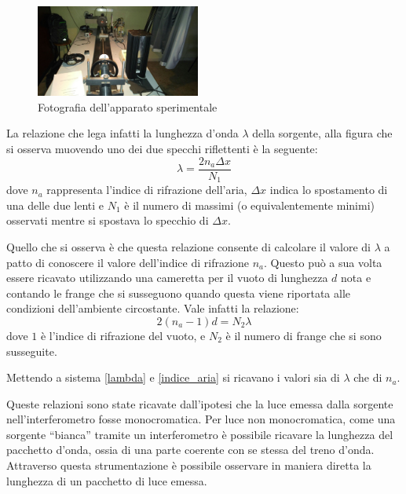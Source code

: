 \documentclass[a4paper,11pt]{article}
\newcommand{\virgolette}[1]{``#1''}
\begin{document}
	\begin{figure}
		\vspace{-1cm}
		\caption{Fotografia dell'apparato sperimentale}
		\vspace{0.2cm}
		\centering
		\label{apparato}
		\includegraphics[width=0.48\textwidth]{apparato}
		\vspace{-0.5cm}
	\end{figure}
	
	La relazione che lega infatti la lunghezza d'onda $\lambda$ della sorgente, alla figura che si osserva muovendo uno dei due specchi riflettenti è la seguente:
	\begin{equation}\label{lambdana1}
		\lambda=\dfrac{2n_a\Delta x}{N_1}
	\end{equation}
	dove $n_a$ rappresenta l'indice di rifrazione dell'aria, $\Delta x$ indica lo spostamento di una delle due lenti e $N_1$ è il numero di massimi (o equivalentemente minimi) osservati mentre si spostava lo specchio di $\Delta x$.
	
	Quello che si osserva è che questa relazione consente di calcolare il valore di $\lambda$ a patto di conoscere il valore dell'indice di rifrazione $n_a$. Questo può a sua volta essere ricavato utilizzando una cameretta per il vuoto di lunghezza $d$ nota e contando le frange che si susseguono quando questa viene riportata alle condizioni dell'ambiente circostante. Vale infatti la relazione:
	\begin{equation}\label{indice_aria}
		2 (n_a - 1) d = N_2 \lambda
	\end{equation}
	dove $1$ è l'indice di rifrazione del vuoto, e $N_2$ è il numero di frange che si sono susseguite.
	
	Mettendo a sistema \ref{lambda} e \ref{indice_aria} si ricavano i valori sia di $\lambda$ che di $n_a$.
	
	Queste relazioni sono state ricavate dall'ipotesi che la luce emessa dalla sorgente nell'interferometro fosse monocromatica. Per luce non monocromatica, come una sorgente \virgolette{bianca} tramite un interferometro è possibile ricavare la lunghezza del pacchetto d'onda, ossia di una parte coerente con se stessa del treno d'onda. Attraverso questa strumentazione è possibile osservare in maniera diretta la lunghezza di un pacchetto di luce emessa.
	
\end{document}
